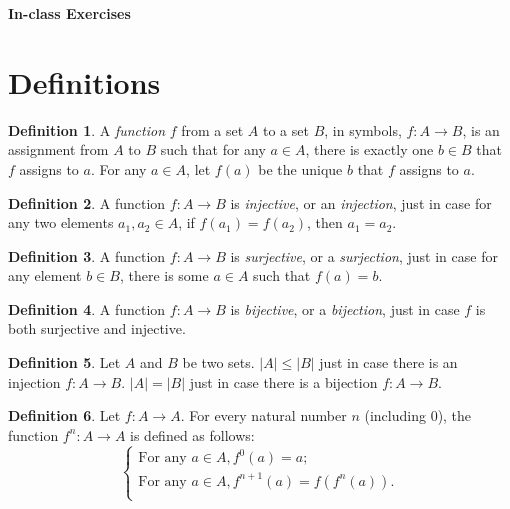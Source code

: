 \documentclass[11pt]{article}
\theoremstyle{definition}
\newtheorem{defn}{Definition}
\begin{document}




\begin{center}
{\LARGE \bf In-class Exercises}
\end{center}

\smallskip

\section{Definitions}

\begin{defn}
A \textit{function} $f$ from a set $A$ to a set $B$, in symbols, $f: A \rightarrow B$, is an assignment from $A$ to $B$ such that for any $a \in A$, there is exactly one $b \in B$ that $f$ assigns to $a$. For any $a \in A$, let $f(a)$ be the unique $b$ that $f$ assigns to $a$.
\end{defn}

\begin{defn}
A function $f: A \rightarrow B$ is \textit{injective}, or an \textit{injection}, just in case for any two elements $a_1, a_2 \in A$, if $f(a_1) = f(a_2)$, then $a_1 = a_2$.
\end{defn}

\begin{defn}
A function $f: A \rightarrow B$ is \textit{surjective}, or a \textit{surjection}, just in case for any element $b \in B$, there is some $a \in A$ such that $f(a) = b$.
\end{defn}

\begin{defn}
A function $f: A \rightarrow B$ is \textit{bijective}, or a \textit{bijection}, just in case $f$ is both surjective and injective.
\end{defn}

\begin{defn}
Let $A$ and $B$ be two sets. $|A| \leqslant |B|$ just in case there is an injection $f: A \rightarrow B$. $|A| = |B|$ just in case there is a bijection $f: A \rightarrow B$.
\end{defn}

\begin{defn}
Let $f: A \rightarrow A$. For every natural number $n$ (including $0$), the function $f^n: A \rightarrow A$ is defined as follows:
\[
\begin{cases}
\text{For any} \, \, a \in A, f^0(a) = a; \\
\text{For any} \, \, a \in A, f^{n+1}(a) = f(f^n(a)). \\
\end{cases}
\]
\end{defn}
\end{document}
